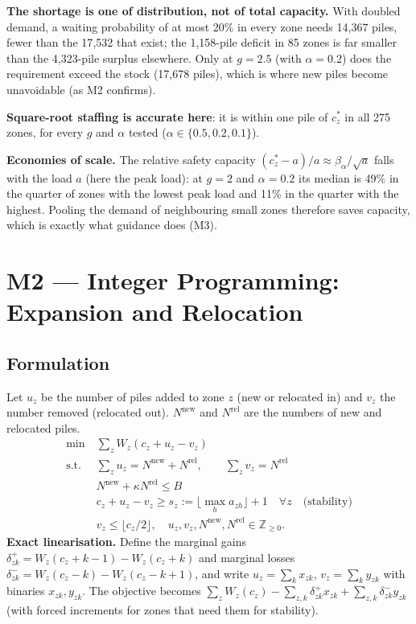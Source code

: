 \documentclass[11pt,a4paper]{article}
\begin{document}
\begin{enumerate*}[label=(\roman*)]
\item \textbf{The shortage is one of distribution, not of total capacity.} With doubled demand, a waiting probability of at most 20\% in every zone needs 14{,}367 piles, fewer than the 17{,}532 that exist; the 1{,}158-pile deficit in 85 zones is far smaller than the 4{,}323-pile surplus elsewhere. Only at $g = 2.5$ (with $\alpha = 0.2$) does the requirement exceed the stock (17{,}678 piles), which is where new piles become unavoidable (as M2 confirms).
\item \textbf{Square-root staffing is accurate here}: it is within one pile of $c_z^*$ in all 275 zones, for every $g$ and $\alpha$ tested ($\alpha \in \{0.5, 0.2, 0.1\}$).
\item \textbf{Economies of scale.} The relative safety capacity $(c_z^* - a)/a \approx \beta_\alpha/\sqrt a$ falls with the load $a$ (here the peak load): at $g=2$ and $\alpha=0.2$ its median is 49\% in the quarter of zones with the lowest peak load and 11\% in the quarter with the highest. Pooling the demand of neighbouring small zones therefore saves capacity, which is exactly what guidance does (M3).
\end{enumerate*}

\section{M2 --- Integer Programming: Expansion and Relocation}\label{sec:m2}
\subsection{Formulation}
Let $u_z$ be the number of piles added to zone $z$ (new or relocated in) and $v_z$ the number removed (relocated out). $N^{\text{new}}$ and $N^{\text{rel}}$ are the numbers of new and relocated piles.
\begin{align}
\min\ & \sum_{z} W_z(c_z + u_z - v_z) \label{eq:m2obj}\\
\text{s.t.}\ & \textstyle\sum_z u_z = N^{\text{new}} + N^{\text{rel}},\qquad \sum_z v_z = N^{\text{rel}} \\
& N^{\text{new}} + \kappa N^{\text{rel}} \le B \\
& c_z + u_z - v_z \ge s_z := \lfloor \max_h a_{zh}\rfloor + 1 \quad\forall z \quad\text{(stability)}\\
& v_z \le \lfloor c_z/2 \rfloor,\quad u_z, v_z, N^{\text{new}}, N^{\text{rel}} \in \mathbb Z_{\ge 0}.
\end{align}
\textbf{Exact linearisation.} Define the marginal gains $\delta^+_{zk} = W_z(c_z+k-1) - W_z(c_z+k)$ and marginal losses $\delta^-_{zk} = W_z(c_z-k) - W_z(c_z-k+1)$, and write $u_z = \sum_k x_{zk}$, $v_z = \sum_k y_{zk}$ with binaries $x_{zk}, y_{zk}$. The objective becomes $\sum_z W_z(c_z) - \sum_{z,k}\delta^+_{zk}x_{zk} + \sum_{z,k}\delta^-_{zk}y_{zk}$ (with forced increments for zones that need them for stability).
\end{document}
